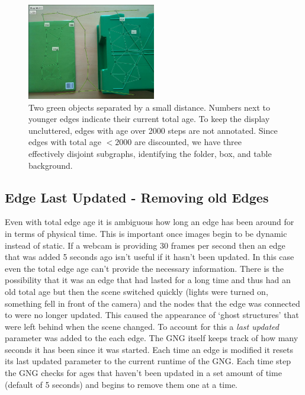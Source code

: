 \documentclass{article}
\renewcommand{\|}{\origbar} %
\begin{document}
\begin{figure}[h!]
  \centering
    \includegraphics[width=0.5\textwidth]{total_edge_age.png}

  \caption{Two green objects separated by a small distance. Numbers next to younger edges indicate their current total age. To keep the display uncluttered, edges with age over 2000 steps are not annotated. Since edges with total age $< 2000$ are discounted, we have three effectively disjoint subgraphs, identifying the folder, box, and table background.} 
  \label{fig:totalEdgeAge}
\end{figure}

\subsection{Edge Last Updated - Removing old Edges}

Even with total edge age it is ambiguous how long an edge has been around for in terms of physical time. This is important once images begin to be dynamic instead of static. If a webcam is providing 30 frames per second then an edge that was added 5 seconds ago isn't useful if it hasn't been updated. In this case even the total edge age can't provide the necessary information. There is the possibility that it was an edge that had lasted for a long time and thus had an old total age but then the scene switched quickly (lights were turned on, something fell in front of the camera) and the nodes that the edge was connected to were no longer updated. This caused the appearance of `ghost structures' that were left behind when the scene changed. To account for this a {\em last updated} parameter was added to the each edge. The GNG itself keeps track of how many seconds it has been since it was started. Each time an edge is modified it resets its last updated parameter to the current runtime of the GNG. Each time step the GNG checks for ages that haven't been updated in a set amount of time (default of 5 seconds) and begins to remove them one at a time.
\end{document}

